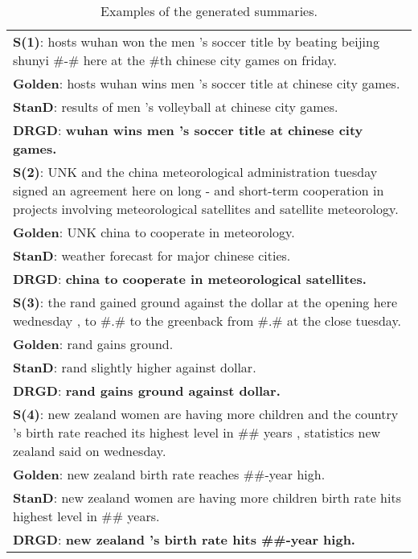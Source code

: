 \documentclass[11pt,letterpaper]{article}
\begin{document}
\begin{table}[!t]
	\centering
	
	\caption{Examples of the generated summaries.}
	\label{tab:latent_structure}
	\begin{tabular}{p{7.2cm}}
		\hline
		\hline
		\textbf{S(1)}: hosts wuhan won the men 's soccer title by beating beijing shunyi \#-\# here at the \#th chinese city games on friday.\\
		\textbf{Golden}: hosts wuhan wins men 's soccer title at chinese city games.\\
		\textbf{StanD}: results of men 's volleyball at chinese city games.\\
		\textbf{DRGD}: \textbf{wuhan wins men 's soccer title at chinese city games.}\\
		\hline
		\textbf{S(2)}: UNK and the china meteorological administration tuesday signed an agreement here on long - and short-term cooperation in projects involving meteorological satellites and satellite meteorology.\\
		\textbf{Golden}: UNK china to cooperate in meteorology.\\
		\textbf{StanD}: weather forecast for major chinese cities.\\
		\textbf{DRGD}: \textbf{china to cooperate in meteorological satellites.}\\
		\hline
		\textbf{S(3)}: the rand gained ground against the dollar at the opening here wednesday , to \#.\# to the greenback from \#.\# at the close tuesday.\\
		\textbf{Golden}: rand gains ground.\\
		\textbf{StanD}: rand slightly higher against dollar.\\
		\textbf{DRGD}: \textbf{rand gains ground against dollar.}\\
		\hline
		\textbf{S(4)}: new zealand women are having more children and the country 's birth rate reached its highest level in \#\# years , statistics new zealand said on wednesday.\\
		\textbf{Golden}: new zealand birth rate reaches \#\#-year high.\\
		\textbf{StanD}: new zealand women are having more children birth rate hits highest level in \#\# years.\\
		\textbf{DRGD}: \textbf{new zealand 's birth rate hits \#\#-year high.}\\
		\hline
		\hline
	\end{tabular}
\end{table}
\end{document}
